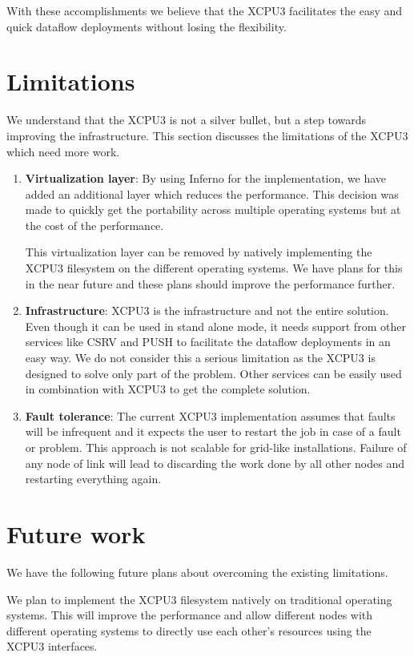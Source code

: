 With these accomplishments we believe that the XCPU3 facilitates the easy and
quick dataflow deployments without losing the flexibility.

\section{Limitations}
We understand that the XCPU3 is not a silver bullet, but a step towards
improving the infrastructure. This section discusses the limitations of the
XCPU3 which need more work.

\begin{enumerate}
\item \textbf{Virtualization layer}: By using Inferno for the implementation,
we have added an additional layer which reduces the performance.  This decision
was made to quickly get the portability across multiple operating systems but at
the cost of the performance. 

This virtualization layer can be removed by natively implementing the XCPU3
filesystem on the different operating systems. We have plans for this in the
near future and these plans should improve the performance further.

\item \textbf{Infrastructure}: XCPU3 is the infrastructure and not the entire
solution.  Even though it can be used in stand alone mode, it needs support
from other services like CSRV and PUSH to facilitate the dataflow
deployments in an easy way. We do not consider this a serious limitation as the
XCPU3 is designed to solve only part of the problem.  Other services can be
easily used in combination with XCPU3 to get the complete solution.

\item \textbf{Fault tolerance}:  The current XCPU3 implementation assumes that
faults will be infrequent and it expects the user to restart the job in case of
a fault or problem.  This approach is not scalable for grid-like
installations.  Failure of any node of link will lead to discarding the work
done by all other nodes and restarting everything again.
\end{enumerate}


\section{Future work}
We have the following future plans about overcoming the existing limitations.

We plan to implement the XCPU3 filesystem natively on traditional operating
systems.  This will improve the performance and allow different nodes with
different operating systems to directly use each other's resources using the
XCPU3 interfaces.

